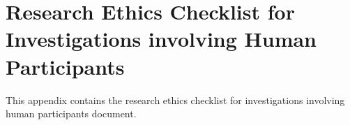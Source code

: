 %
%
%                 

\chapter{Research Ethics Checklist for Investigations involving Human Participants}
\label{sec:appendixf}

This appendix contains the  research ethics checklist for investigations involving human participants document.



